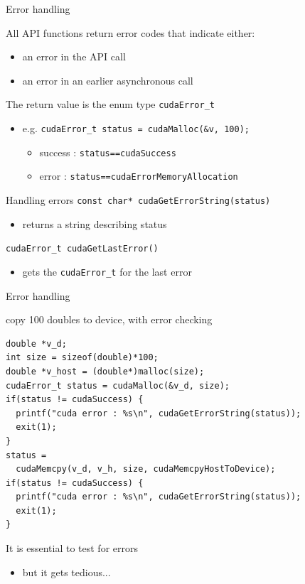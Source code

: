 \documentclass[aspectratio=43]{beamer}
\newcommand{\lst}[1]{\lstinline!#1!}
\begin{document}
\begin{frame}[fragile]{Error handling}

    \begin{info}{}
        All API functions return error codes that indicate either:
        \begin{itemize}
            \item an error in the API call
            \item an error in an earlier asynchronous call
        \end{itemize}
        The return value is the enum type \lst{cudaError_t}
        \begin{itemize}
            \item e.g. \lst{cudaError_t status = cudaMalloc(&v, 100);}
            \begin{itemize}
                \item success : \lst{status==cudaSuccess}
                \item error   : \lst{status==cudaErrorMemoryAllocation}
            \end{itemize}
        \end{itemize}
    \end{info}

    \begin{info}{Handling errors}
        \lst{const char* cudaGetErrorString(status)}
        \begin{itemize}
            \item returns a string describing status
        \end{itemize}
        \lst{cudaError_t cudaGetLastError()}
        \begin{itemize}
            \item gets the \lst{cudaError_t} for the last error
        \end{itemize}
    \end{info}

\end{frame}

\begin{frame}[fragile]{Error handling}

    \begin{code}{copy 100 doubles to device, with error checking}
        \begin{lstlisting}[style=boxcuda]
double *v_d;
int size = sizeof(double)*100;
double *v_host = (double*)malloc(size);
cudaError_t status = cudaMalloc(&v_d, size);
if(status != cudaSuccess) {
  printf("cuda error : %s\n", cudaGetErrorString(status));
  exit(1);
}
status =
  cudaMemcpy(v_d, v_h, size, cudaMemcpyHostToDevice);
if(status != cudaSuccess) {
  printf("cuda error : %s\n", cudaGetErrorString(status));
  exit(1);
}
        \end{lstlisting}
    \end{code}

    It is essential to test for errors
    \begin{itemize}
        \item but it gets tedious...
    \end{itemize}
\end{frame}
\end{document}
